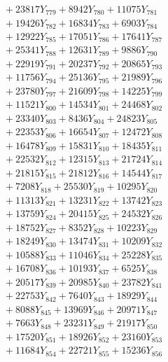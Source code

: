 \documentclass[a4paper,10pt]{article}
\begin{document}
{\begin{align}
&\;  + 23817 Y_{779} + 8942 Y_{780} + 11075 Y_{781} \\[0.3ex]
&\;  + 19426 Y_{782} + 16834 Y_{783} + 6903 Y_{784} \\[0.3ex]
&\;  + 12922 Y_{785} + 17051 Y_{786} + 17641 Y_{787} \\[0.3ex]
&\;  + 25341 Y_{788} + 12631 Y_{789} + 9886 Y_{790} \\[0.3ex]
&\;  + 22919 Y_{791} + 20237 Y_{792} + 20865 Y_{793} \\[0.3ex]
&\;  + 11756 Y_{794} + 25136 Y_{795} + 21989 Y_{796} \\[0.3ex]
&\;  + 23780 Y_{797} + 21609 Y_{798} + 14225 Y_{799} \\[0.3ex]
&\;  + 11521 Y_{800} + 14534 Y_{801} + 24468 Y_{802} \\[0.3ex]
&\;  + 23340 Y_{803} + 8436 Y_{804} + 24823 Y_{805} \\[0.3ex]
&\;  + 22353 Y_{806} + 16654 Y_{807} + 12472 Y_{808} \\[0.5ex]\allowbreak
&\;  + 16478 Y_{809} + 15831 Y_{810} + 18435 Y_{811} \\[0.3ex]
&\;  + 22532 Y_{812} + 12315 Y_{813} + 21724 Y_{814} \\[0.3ex]
&\;  + 21815 Y_{815} + 21812 Y_{816} + 14544 Y_{817} \\[0.3ex]
&\;  + 7208 Y_{818} + 25530 Y_{819} + 10295 Y_{820} \\[0.3ex]
&\;  + 11313 Y_{821} + 13231 Y_{822} + 13742 Y_{823} \\[0.3ex]
&\;  + 13759 Y_{824} + 20415 Y_{825} + 24532 Y_{826} \\[0.3ex]
&\;  + 18752 Y_{827} + 8352 Y_{828} + 10223 Y_{829} \\[0.3ex]
&\;  + 18249 Y_{830} + 13474 Y_{831} + 10209 Y_{832} \\[0.3ex]
&\;  + 10588 Y_{833} + 11046 Y_{834} + 25228 Y_{835} \\[0.3ex]
&\;  + 16708 Y_{836} + 10193 Y_{837} + 6525 Y_{838} \\[0.5ex]\allowbreak
&\;  + 20517 Y_{839} + 20985 Y_{840} + 23782 Y_{841} \\[0.3ex]
&\;  + 22753 Y_{842} + 7640 Y_{843} + 18929 Y_{844} \\[0.3ex]
&\;  + 8088 Y_{845} + 13969 Y_{846} + 20971 Y_{847} \\[0.3ex]
&\;  + 7663 Y_{848} + 23231 Y_{849} + 21917 Y_{850} \\[0.3ex]
&\;  + 17520 Y_{851} + 18926 Y_{852} + 23160 Y_{853} \\[0.3ex]
&\;  + 11684 Y_{854} + 22721 Y_{855} + 15236 Y_{856} \\[0.3ex]

\end{align}}
\end{document}
